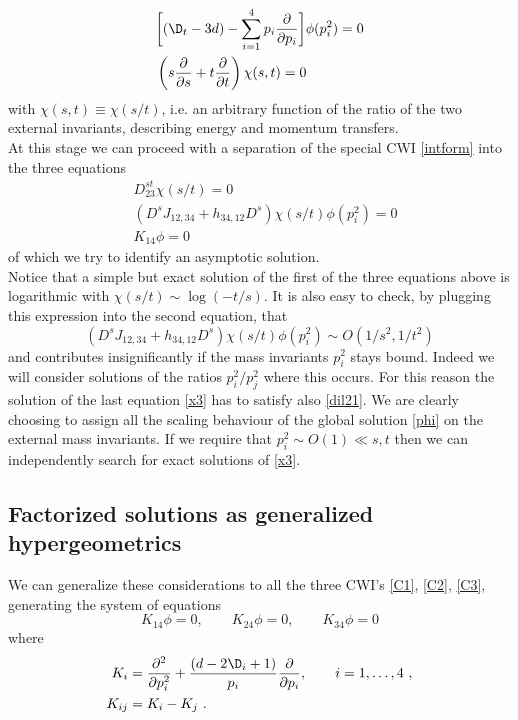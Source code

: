 \documentclass[a4paper,11pt,openright,twoside]{book}
\numberwithin{equation}{section}
\begin{document}
{{	\begin{align}
		\label{dil21}
		&\bigg[(\D_t-3d)-\sum_{i=1}^4p_i\frac{\partial}{\partial p_i}\bigg]\phi(p_i^2)=0\\
		&\left(s\frac{\partial}{\partial s}+t\frac{\partial}{\partial t}\right)\chi(s,t)=0
		\label{dil22}
	\end{align}
	with $\chi(s,t)\equiv \chi(s/t)$, i.e. an arbitrary function of the ratio of the two external invariants, describing energy and momentum transfers.\\
	At this stage we can proceed with a separation of the special CWI \eqref{intform} into the three equations
	\begin{align}
		&D_{23}^{st}\chi(s/t)=0  \label{x1}\\
		&(D^s J_{12,34}+ h_{34,12}D^s)\chi(s/t) \phi(p_i^2)=0 \label{x2}\\
		&{K}_{14}\phi=0 \label{x3}
	\end{align}
	of which we try to identify an asymptotic solution.\\
	Notice that a simple but exact solution of the first of the three equations above is logarithmic with $\chi(s/t)\sim \log(-t/s)$. It is also easy to check, by plugging this expression into the second equation, that 
	\begin{equation}
		\left( D^s J_{12,34}+ h_{34,12}D^s\right)\chi(s/t) \phi(p_i^2)\sim O(1/s^2,1/t^2) 
	\end{equation}
	and contributes insignificantly if the mass invariants $p_i^2$ stays bound. Indeed we will consider solutions of the ratios 
	$p_i^2/p_j^2$ where this occurs. For this reason the solution of the last equation \eqref{x3} has to satisfy also \eqref{dil21}. We are clearly choosing to assign all the scaling behaviour of the global solution \eqref{phi} on the external mass invariants. If we require that  $p_i^2\sim O(1) \ll s, t$ then we can independently search for exact solutions of \eqref{x3}. 
	\subsection{Factorized solutions as generalized hypergeometrics}
	We can generalize these considerations to all the three CWI's \eqref{C1}, \eqref{C2}, \eqref{C3}, generating the system of equations 
	\begin{equation}
		{K}_{14}\phi=0,\qquad {K}_{24}\phi=0,\qquad {K}_{34}\phi=0\label{CWILaur}
	\end{equation}
	where 
	\begin{align}
		{K}_i&=\frac{\partial^2}{\partial p_i^2}+\frac{(d-2\D_i+1)}{p_i}\frac{\partial}{\partial p_i},\qquad i=1,\dots,4\ ,\\
		{K}_{ij}&={K}_i-{K}_j\ .
	\end{align}
	
}}
\end{document}
